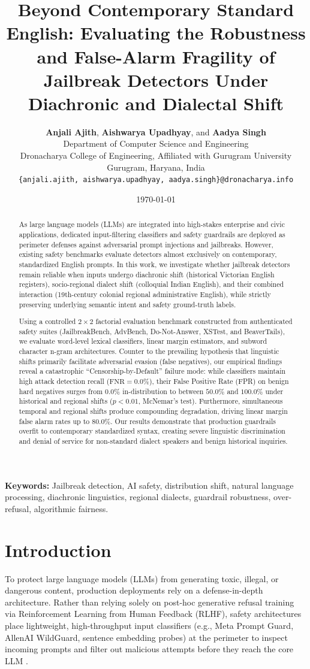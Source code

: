 \documentclass[11pt,a4paper]{article}
\title{\textbf{Beyond Contemporary Standard English: Evaluating the Robustness and False-Alarm Fragility of Jailbreak Detectors Under Diachronic and Dialectal Shift}}
\author{
  \textbf{Anjali Ajith}, \textbf{Aishwarya Upadhyay}, and \textbf{Aadya Singh}\\[0.5em]
  \small Department of Computer Science and Engineering\\
  \small Dronacharya College of Engineering, Affiliated with Gurugram University\\
  \small Gurugram, Haryana, India\\
  \small \texttt{\{anjali.ajith, aishwarya.upadhyay, aadya.singh\}@dronacharya.info}
}
\date{\today}
\begin{document}
\maketitle

\begin{abstract}
As large language models (LLMs) are integrated into high-stakes enterprise and civic applications, dedicated input-filtering classifiers and safety guardrails are deployed as perimeter defenses against adversarial prompt injections and jailbreaks. However, existing safety benchmarks evaluate detectors almost exclusively on contemporary, standardized English prompts. In this work, we investigate whether jailbreak detectors remain reliable when inputs undergo diachronic shift (historical Victorian English registers), socio-regional dialect shift (colloquial Indian English), and their combined interaction (19th-century colonial regional administrative English), while strictly preserving underlying semantic intent and safety ground-truth labels. 

Using a controlled $2 \times 2$ factorial evaluation benchmark constructed from authenticated safety suites (JailbreakBench, AdvBench, Do-Not-Answer, XSTest, and BeaverTails), we evaluate word-level lexical classifiers, linear margin estimators, and subword character n-gram architectures. Counter to the prevailing hypothesis that linguistic shifts primarily facilitate adversarial evasion (false negatives), our empirical findings reveal a catastrophic ``Censorship-by-Default'' failure mode: while classifiers maintain high attack detection recall ($\text{FNR} = 0.0\%$), their False Positive Rate (FPR) on benign hard negatives surges from $0.0\%$ in-distribution to between $50.0\%$ and $100.0\%$ under historical and regional shifts ($p < 0.01$, McNemar's test). Furthermore, simultaneous temporal and regional shifts produce compounding degradation, driving linear margin false alarm rates up to $80.0\%$. Our results demonstrate that production guardrails overfit to contemporary standardized syntax, creating severe linguistic discrimination and denial of service for non-standard dialect speakers and benign historical inquiries.
\end{abstract}

\noindent\textbf{Keywords:} Jailbreak detection, AI safety, distribution shift, natural language processing, diachronic linguistics, regional dialects, guardrail robustness, over-refusal, algorithmic fairness.

\section{Introduction}
\label{sec:intro}
To protect large language models (LLMs) from generating toxic, illegal, or dangerous content, production deployments rely on a defense-in-depth architecture. Rather than relying solely on post-hoc generative refusal training via Reinforcement Learning from Human Feedback (RLHF), safety architectures place lightweight, high-throughput input classifiers (e.g., Meta Prompt Guard, AllenAI WildGuard, sentence embedding probes) at the perimeter to inspect incoming prompts and filter out malicious attempts before they reach the core LLM \cite{han2024wildguard, fomin2026whenbenchmarkslie}.
\end{document}
